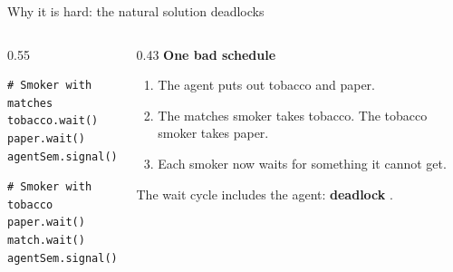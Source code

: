 \documentclass[aspectratio=169,10pt,xcolor=table]{beamer}
\begin{document}
\begin{frame}[fragile]{Why it is hard: the natural solution deadlocks}
\begin{columns}[T]
\begin{column}{0.55\textwidth}
            \begin{minipage}[t]{0.47\textwidth}
\begin{lstlisting}
# Smoker with matches
tobacco.wait()
paper.wait()
agentSem.signal()
\end{lstlisting}
            \end{minipage}\hfill
            \begin{minipage}[t]{0.47\textwidth}
\begin{lstlisting}
# Smoker with tobacco
paper.wait()
match.wait()
agentSem.signal()
\end{lstlisting}
            \end{minipage}
        \end{column}
        \begin{column}{0.43\textwidth}
            \small
            \textbf{One bad schedule}
            \begin{enumerate}
                \setlength\itemsep{1pt}
                \item The agent puts out tobacco and paper.
                \item The matches smoker takes tobacco. The tobacco smoker takes paper.
                \item Each smoker now waits for something it cannot get.
            \end{enumerate}
            \vspace{2pt}
            \centering

            \footnotesize The wait cycle includes the agent: \textbf{deadlock}
            \cite{downey}.
        \end{column}
    \end{columns}
\end{frame}
\end{document}
